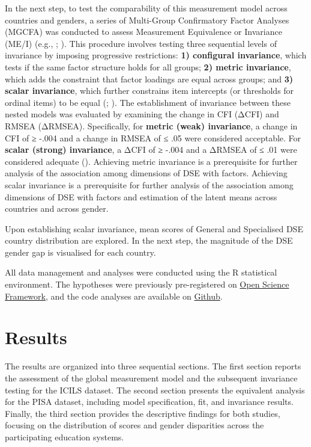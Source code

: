 \documentclass[
  letterpaper,
  DIV=11,
  numbers=noendperiod]{scrartcl}
\begin{document}
In the next step, to test the comparability of this measurement model
across countries and genders, a series of Multi-Group Confirmatory
Factor Analyses (MGCFA) was conducted to assess Measurement Equivalence
or Invariance (ME/I) (e.g.,
;
). This
procedure involves testing three sequential levels of invariance by
imposing progressive restrictions: \textbf{1) configural invariance},
which tests if the same factor structure holds for all groups;
\textbf{2) metric invariance}, which adds the constraint that factor
loadings are equal across groups; and \textbf{3) scalar invariance},
which further constrains item intercepts (or thresholds for ordinal
items) to be equal (; ). The establishment of invariance between these nested models was
evaluated by examining the change in CFI (ΔCFI) and RMSEA (ΔRMSEA).
Specifically, for \textbf{metric (weak) invariance}, a change in CFI of
≥ -.004 and a change in RMSEA of ≤ .05 were considered acceptable. For
\textbf{scalar (strong) invariance}, a ΔCFI of ≥ -.004 and a ΔRMSEA of ≤
.01 were considered adequate
().
Achieving metric invariance is a prerequisite for further analysis of
the association among dimensions of DSE with factors. Achieving scalar
invariance is a prerequisite for further analysis of the association
among dimensions of DSE with factors and estimation of the latent means
across countries and across gender.

Upon establishing scalar invariance, mean scores of General and
Specialised DSE country distribution are explored. In the next step, the
magnitude of the DSE gender gap is visualised for each country.

All data management and analyses were conducted using the R statistical
environment. The hypotheses were previously pre-registered on
\href{https://osf.io/fxhc5/overview}{Open Science Framework}, and the
code analyses are available on
\href{https://github.com/milenio-nudos/picils_dse}{Github}.

\section{Results}\label{results}

The results are organized into three sequential sections. The first
section reports the assessment of the global measurement model and the
subsequent invariance testing for the ICILS dataset. The second section
presents the equivalent analysis for the PISA dataset, including model
specification, fit, and invariance results. Finally, the third section
provides the descriptive findings for both studies, focusing on the
distribution of scores and gender disparities across the participating
education systems.
\end{document}

